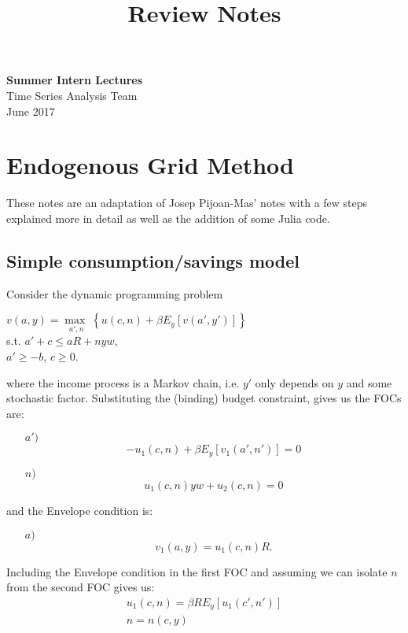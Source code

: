 \documentclass[11pt]{article}
\theoremstyle{definition}
\begin{document}
\setcounter{section}{0}
\title{Review Notes}

\thispagestyle{empty}

\begin{center}
{\LARGE \bf Summer Intern Lectures}\\
{\large Time Series Analysis Team}\\
June 2017
\end{center}
\section{Endogenous Grid Method}
These notes are an adaptation of Josep Pijoan-Mas' notes with a few steps explained more in detail as well as the addition of some Julia code.

\subsection{Simple consumption/savings model}
Consider the dynamic programming problem
\begin{center}
	$v(a,y)= \underset{a',n}{\max\;}\left\{u(c,n) + \beta E_{y}\left[v(a',y')\right] \right\}$\\
	s.t. $a'+c\leq aR + nyw$,\\
	$a'\geq -b$, $c\geq 0$.
\end{center}
where the income process is a Markov chain, i.e. $y'$ only depends on $y$ and some stochastic factor. Substituting the (binding) budget constraint, gives us the FOCs are:
\begin{itemize}
	\item[$a')$] $$-u_{1}(c,n)+\beta E_{y}\left[v_{1}(a',n')\right]=0$$
	\item[$n)$] $$u_{1}(c,n)yw + u_{2}(c,n)=0$$
\end{itemize}
and the Envelope condition is:
\begin{itemize}
	\item[$a)$]$$v_{1}(a,y)=u_{1}(c,n)R.$$
\end{itemize}

Including the Envelope condition in the first FOC and assuming we can isolate $n$ from the second FOC gives us:
\begin{eqnarray}
u_{1}(c,n)=\beta R E_{y}\left[u_{1}(c',n')\right]\\
n = n(c,y)
\end{eqnarray}
\end{document}
